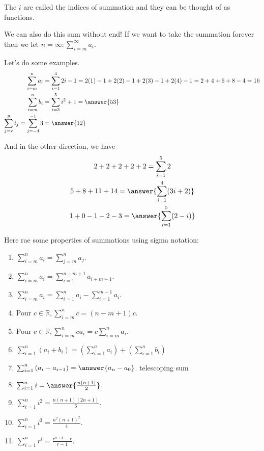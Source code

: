\documentclass{ximera}
\begin{document}
The $i$ are called the indices of summation and they can be thought of as functions.

We can also do this sum without end! If we want to take the summation forever then we let $n=\infty: \sum_{i=m}^{\infty} a_{i}$.

\begin{example}\label{example:12-3}
Let's do some examples.
\[
\begin{aligned}
\sum_{i=m}^{n} a_{i} & =\sum_{i=1}^{4} 2 i-1=2(1)-1+2(2)-1+2(3)-1+2(4)-1=2+4+6+8-4=16 \\
\sum_{i=m}^{n} b_{i} & =\sum_{i=3}^{5} i^{2}+1= \answer{53} \\
\sum_{j=x}^{y} i_{j}=\sum_{j=-4}^{-1} 3 & = \answer{12}
\end{aligned}
\]

And in the other direction, we have
\[
\begin{gathered}
2+2+2+2+2=\sum_{i=1}^{5} 2 \\
5+8+11+14=\answer{\sum_{i=1}^{4} (3i+2)} \\
1+0-1-2-3=\answer{\sum_{i=1}^{5} (2-i)}
\end{gathered}
\]
\end{example}

Here rae some properties of summations using sigma notation:

\begin{proposition}\label{proposition:12-4}
\begin{enumerate}
  \item $\sum_{i=m}^{n} a_{i}=\sum_{j=m}^{n} a_{j}$.
  \item $\sum_{i=m}^{n} a_{i}=\sum_{i=1}^{n-m+1} a_{i+m-1}$.
  \item $\sum_{i=m}^{n} a_{i}=\sum_{i=1}^{n} a_{i}-\sum_{i=1}^{m-1} a_{i}$.
  \item Pour $c \in \mathbb{R}, \sum_{i=m}^{n} c=(n-m+1) c$.
  \item Pour $c \in \mathbb{R}, \sum_{i=m}^{n} c a_{i}=c \sum_{i=m}^{n} a_{i}$.
  \item $\sum_{i=1}^{n}\left(a_{i}+b_{i}\right)=\left(\sum_{i=1}^{n} a_{i}\right)+\left(\sum_{i=1}^{n} b_{i}\right)$
  \item $\sum_{i=1}^{n}\left(a_{i}-a_{i-1}\right)=\answer{a_{n}-a_{0}}$. telescoping sum
  \item $\sum_{i=1}^{n} i=\answer{\frac{n(n+1)}{2}}$.
  \item $\sum_{i=1}^{n} i^{2}=\frac{n(n+1)(2 n+1)}{6}$.
  \item $\sum_{i=1}^{n} i^{3}=\frac{n^{2}(n+1)^{2}}{4}$.
  \item $\sum_{i=1}^{n} r^{i}=\frac{r^{n+1}-r}{r-1}$.
\end{enumerate}
\end{proposition}
\end{document}
